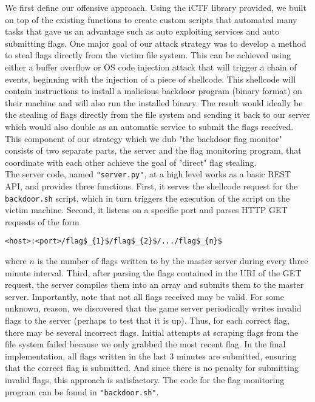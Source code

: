 \documentclass[12pt]{report}
\begin{document}
\noindent We first define our offensive approach. Using the iCTF library provided, we built on top of the existing functions to create custom scripts that automated many tasks that gave us an advantage such as auto exploiting services and auto submitting flags. One major goal of our attack strategy was to develop a method to steal flags directly from the victim file system. This can be achieved using either a buffer overflow or OS code injection attack that will trigger a chain of events, beginning with the injection of a piece of shellcode. This shellcode will contain instructions to install a malicious backdoor program (binary format) on their machine and will also run the installed binary. The result would ideally be the stealing of flags directly from the file system and sending it back to our server which would also double as an automatic service to submit the flags received. This component of our strategy which we dub "the backdoor flag monitor" consists of two separate parts, the server and the flag monitoring program, that coordinate with each other achieve the goal of "direct" flag stealing. \\

\noindent The server code, named \texttt{"server.py"}, at a high level works as a basic REST API, and provides three functions. First, it serves the shellcode request for the \texttt{backdoor.sh} script, which in turn triggers the execution of the script on the victim machine. Second, it listens on a specific port and parses HTTP GET requests of the form

\begin{lstlisting}[mathescape]
    <host>:<port>/flag$_{1}$/flag$_{2}$/.../flag$_{n}$
\end{lstlisting}

\noindent
where $n$ is the number of flags written to by the master server during every three minute interval. Third, after parsing the flags contained in the URI of the GET request, the server compiles them into an array and submits them to the master server. Importantly, note that not all flags received may be valid. For some unknown, reason, we discovered that the game server periodically writes invalid flags to the server (perhaps to test that it is up). Thus, for each correct flag, there may be several incorrect flags. Initial attempts at scraping flags from the file system failed because we only grabbed the most recent flag. In the final implementation, all flags written in the last 3 minutes are submitted, ensuring that the correct flag is submitted. And since there is no penalty for submitting invalid flags, this approach is satisfactory. The code for the flag monitoring program can be found in \texttt{"backdoor.sh"}.\\
\end{document}
